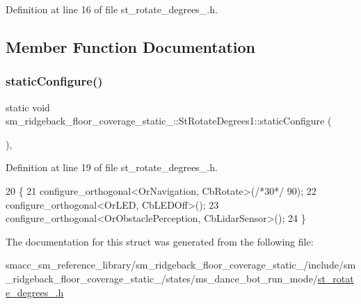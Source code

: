 Definition at line 16 of file st\+\_\+rotate\+\_\+degrees\+\_.\+h.



\subsection{Member Function Documentation}
\mbox{\label{structsm__ridgeback__floor__coverage__static__1_1_1StRotateDegrees1_a047856e8bf0eb8f4e5bad18baf343451}} 
\subsubsection{\texorpdfstring{static\+Configure()}{staticConfigure()}}
{\footnotesize\ttfamily static void sm\+\_\+ridgeback\+\_\+floor\+\_\+coverage\+\_\+static\+\_\+::\+St\+Rotate\+Degrees1\+::static\+Configure (\begin{DoxyParamCaption}{ }\end{DoxyParamCaption})\hspace{0.3cm}{\ttfamily [inline]}, {\ttfamily [static]}}



Definition at line 19 of file st\+\_\+rotate\+\_\+degrees\+\_.\+h.


\begin{DoxyCode}
20     \{
21       configure\_orthogonal<OrNavigation, CbRotate>(\textcolor{comment}{/*30*/} 90);
22       configure\_orthogonal<OrLED, CbLEDOff>();
23       configure\_orthogonal<OrObstaclePerception, CbLidarSensor>();
24     \}
\end{DoxyCode}


The documentation for this struct was generated from the following file\+:\begin{DoxyCompactItemize}
\item 
smacc\+\_\+sm\+\_\+reference\+\_\+library/sm\+\_\+ridgeback\+\_\+floor\+\_\+coverage\+\_\+static\+\_/include/sm\+\_\+ridgeback\+\_\+floor\+\_\+coverage\+\_\+static\+\_/states/ms\+\_\+dance\+\_\+bot\+\_\+run\+\_\+mode/\hyperlink{sm__ridgeback__floor__coverage__static__1_2include_2sm__ridgeback__floor__coverage__static__1_2s4b58e67616221f99ac2a3c79ac638e3f}{st\+\_\+rotate\+\_\+degrees\+\_.\+h}\end{DoxyCompactItemize}
